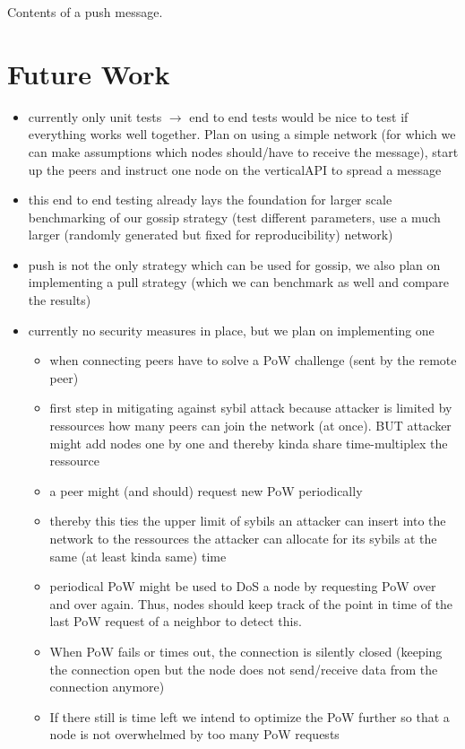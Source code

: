 \documentclass[a4paper,english,10pt,NET]{tumarticle}
\newcommand{\tos}{$\to$\xspace}
\begin{document}
\begin{table}
	\centering
	
	\caption{Contents of a push message.}
	\label{tab:push}
\end{table}

\section{Future Work} \label{sec:future}
\begin{itemize}
	\item currently only unit tests \tos end to end tests would be nice to test if everything works well together. Plan on using a simple network (for which we can make assumptions which nodes should/have to receive the message), start up the peers and instruct one node on the verticalAPI to spread a message
	\item this end to end testing already lays the foundation for larger scale benchmarking of our gossip strategy (test different parameters, use a much larger (randomly generated but fixed for reproducibility) network)
	\item push is not the only strategy which can be used for gossip, we also plan on implementing a pull strategy (which we can benchmark as well and compare the results)
	\item currently no security measures in place, but we plan on implementing one
		\begin{itemize}
			\item when connecting peers have to solve a PoW challenge (sent by the remote peer)
			\item first step in mitigating against sybil attack because attacker is limited by ressources how many peers can join the network (at once). BUT attacker might add nodes one by one and thereby kinda share time-multiplex the ressource
			\item a peer might (and should) request new PoW periodically
			\item thereby this ties the upper limit of sybils an attacker can insert into the network to the ressources the attacker can allocate for its sybils at the same (at least kinda same) time
			\item periodical PoW might be used to DoS a node by requesting PoW over and over again. Thus, nodes should keep track of the point in time of the last PoW request of a neighbor to detect this.
			\item When PoW fails or times out, the connection is silently closed (keeping the connection open but the node does not send/receive data from the connection anymore)
			\item If there still is time left we intend to optimize the PoW further so that a node is not overwhelmed by too many PoW requests
		\end{itemize}
\end{itemize}
\end{document}
